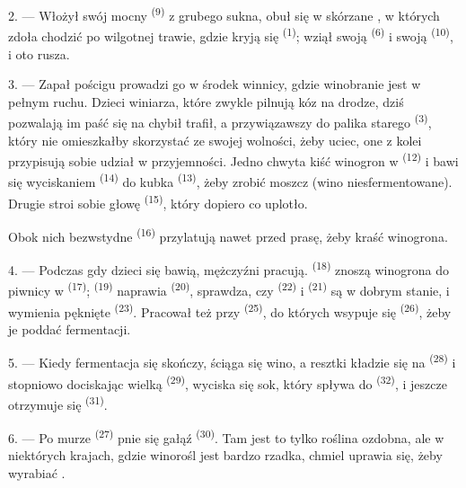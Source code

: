 2. --- Włożył swój mocny  \textsuperscript{(9)} z grubego sukna,
obuł się w skórzane , w których zdoła chodzić po wilgotnej trawie, gdzie
kryją się  \textsuperscript{(1)}; wziął swoją 
\textsuperscript{(6)} i swoją  \textsuperscript{(10)}, i oto
rusza.

3. --- Zapał pościgu prowadzi go w środek winnicy, gdzie winobranie jest w pełnym
ruchu. Dzieci winiarza, które zwykle pilnują kóz na drodze, dziś pozwalają im paść się
na chybił trafił, a przywiązawszy do palika starego  \textsuperscript{(3)},
który nie omieszkałby skorzystać ze swojej wolności, żeby uciec, one z kolei przypisują
sobie udział w przyjemności. Jedno chwyta kiść winogron w 
\textsuperscript{(12)} i bawi się wyciskaniem  \textsuperscript{(14)} do
kubka \textsuperscript{(13)}, żeby zrobić moszcz (wino niesfermentowane). Drugie stroi
sobie głowę  \textsuperscript{(15)}, który dopiero co uplotło.

Obok nich bezwstydne  \textsuperscript{(16)} przylatują nawet przed prasę,
żeby kraść winogrona.

4. --- Podczas gdy dzieci się bawią, mężczyźni pracują. 
\textsuperscript{(18)} znoszą winogrona do piwnicy w 
\textsuperscript{(17)};  \textsuperscript{(19)} naprawia 
\textsuperscript{(20)}, sprawdza, czy  \textsuperscript{(22)} i 
\textsuperscript{(21)} są w dobrym stanie, i wymienia pęknięte 
\textsuperscript{(23)}. Pracował też przy  \textsuperscript{(25)}, do
których wsypuje się  \textsuperscript{(26)}, żeby je poddać
fermentacji.

5. --- Kiedy fermentacja się skończy, ściąga się wino, a resztki kładzie się na
 \textsuperscript{(28)} i stopniowo dociskając wielką 
\textsuperscript{(29)}, wyciska się sok, który spływa do 
\textsuperscript{(32)}, i jeszcze otrzymuje się  \textsuperscript{(31)}.

\VUsaut{6.0mm}
\VUsaut{3.4mm}

6. --- Po murze  \textsuperscript{(27)} pnie się gałąź 
\textsuperscript{(30)}. Tam jest to tylko roślina ozdobna, ale w niektórych krajach,
gdzie winorośl jest bardzo rzadka, chmiel uprawia się, żeby wyrabiać .

